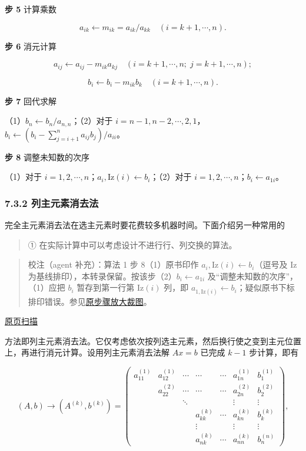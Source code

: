\documentclass[
  10pt,
  fontset=fandol]{ctexart}
\begin{document}
\textbf{步 5} 计算乘数

\[a_{ik}\leftarrow m_{ik}=a_{ik}/a_{kk}\quad(i=k+1,\cdots,n).\]

\textbf{步 6} 消元计算

\[a_{ij}\leftarrow a_{ij}-m_{ik}a_{kj}\quad(i=k+1,\cdots,n;\;j=k+1,\cdots,n);\]

\[b_i\leftarrow b_i-m_{ik}b_k\quad(i=k+1,\cdots,n).\]

\textbf{步 7} 回代求解

（1）\(b_n\leftarrow b_n/a_{n,n}\)；（2）对于 \(i=n-1,n-2,\cdots,2,1\)，\(b_i\leftarrow\left(b_i-\sum_{j=i+1}^{n}a_{ij}b_j\right)/a_{ii}\)。

\textbf{步 8} 调整未知数的次序

（1）对于 \(i=1,2,\cdots,n\)；\(a_i,\mathrm{Iz}(i)\leftarrow b_i\)；（2）对于 \(i=1,2,\cdots,n\)；\(b_i\leftarrow a_{1i}\)。

\subsubsection{7.3.2 列主元素消去法}\label{ux5217ux4e3bux5143ux7d20ux6d88ux53bbux6cd5}

完全主元素消去法在选主元素时要花费较多机器时间。下面介绍另一种常用的

\begin{quote}
① 在实际计算中可以考虑设计不进行行、列交换的算法。
\end{quote}

\begin{quote}
校注（agent 补充）：算法 1 步 8（1）原书印作 \(a_i,\mathrm{Iz}(i)\leftarrow b_i\)（逗号及 Iz 为基线排印），本转录保留。按该步（2）\(b_i\leftarrow a_{1i}\) 及``调整未知数的次序''，（1）应把 \(b_i\) 暂存到第一行第 \(\mathrm{Iz}(i)\) 列，即 \(a_{1,\mathrm{Iz}(i)}\leftarrow b_i\)；疑似原书下标排印错误。参见\href{../assets/ch07a/pdf-186-step8-detail.png}{原步骤放大裁图}。
\end{quote}

\href{../../source-images/pdf-187.jpeg}{原页扫描}

方法即列主元素消去法。它仅考虑依次按列选主元素，然后换行使之变到主元位置上，再进行消元计算。设用列主元素消去法解 \(Ax=b\) 已完成 \(k-1\) 步计算，即有

\[
(A,b)\to(A^{(k)},b^{(k)})=
\left(\begin{array}{cccccc|c}
a_{11}^{(1)}&a_{12}^{(1)}&\cdots&\cdots&\cdots&a_{1n}^{(1)}&b_1^{(1)}\\
&a_{22}^{(2)}&\cdots&\cdots&\cdots&a_{2n}^{(2)}&b_2^{(2)}\\
&&\ddots&&&\vdots&\vdots\\
&&&a_{kk}^{(k)}&\cdots&a_{kn}^{(k)}&b_k^{(k)}\\
&&&\vdots&&\vdots&\vdots\\
&&&a_{nk}^{(k)}&\cdots&a_{nn}^{(k)}&b_n^{(n)}
\end{array}\right),
\]
\end{document}

